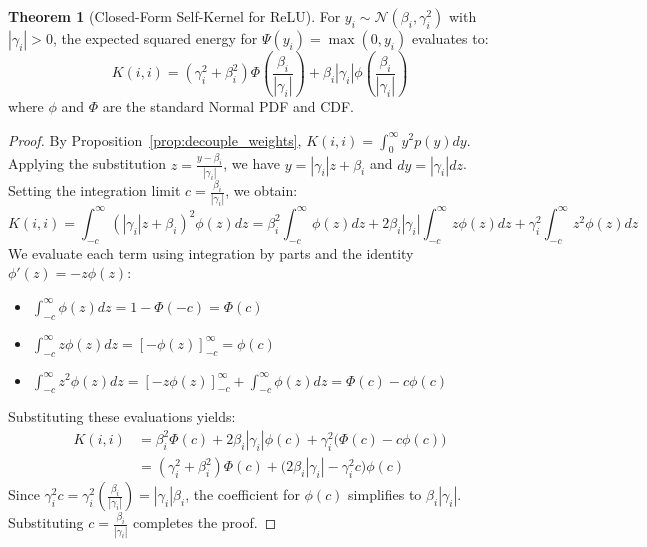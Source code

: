 \documentclass[11pt, a4paper, copyright, gdm]{google}
\newcommand{\calN}{\mathcal{N}}
\newcommand{\normPDF}{\phi}
\newcommand{\normCDF}{\Phi}
\theoremstyle{definition}
\newtheorem{theorem}{Theorem}[section]
\begin{document}
\begin{theorem}[Closed-Form Self-Kernel for ReLU]
\label{theorem:self_kernel}
For $y_i \sim \calN(\beta_i, \gamma_i^2)$ with $|\gamma_i| > 0$, the expected squared energy for $\Psi(y_i) = \max(0, y_i)$ evaluates to:
\begin{equation}
    K(i, i) = (\gamma_i^2 + \beta_i^2)\normCDF\left(\frac{\beta_i}{|\gamma_i|}\right) + \beta_i|\gamma_i|\normPDF\left(\frac{\beta_i}{|\gamma_i|}\right)
\end{equation}
where $\normPDF$ and $\normCDF$ are the standard Normal PDF and CDF.
\end{theorem}
\begin{proof}
By Proposition~\ref{prop:decouple_weights}, $K(i, i) = \int_{0}^{\infty} y^2 p(y) dy$. Applying the substitution $z = \frac{y-\beta_i}{|\gamma_i|}$, we have $y = |\gamma_i| z + \beta_i$ and $dy = |\gamma_i| dz$. Setting the integration limit $c = \frac{\beta_i}{|\gamma_i|}$, we obtain:
\begin{equation*}
    K(i, i) = \int_{-c}^{\infty} (|\gamma_i| z + \beta_i)^2 \normPDF(z) dz = \beta_i^2 \int_{-c}^{\infty} \normPDF(z) dz + 2\beta_i|\gamma_i| \int_{-c}^{\infty} z\normPDF(z) dz + \gamma_i^2 \int_{-c}^{\infty} z^2\normPDF(z) dz
\end{equation*}
We evaluate each term using integration by parts and the identity $\normPDF'(z) = -z\normPDF(z)$:
\begin{itemize}
    \item $\int_{-c}^{\infty} \normPDF(z) dz = 1 - \normCDF(-c) = \normCDF(c)$
    \item $\int_{-c}^{\infty} z\normPDF(z) dz = [-\normPDF(z)]_{-c}^{\infty} = \normPDF(c)$
    \item $\int_{-c}^{\infty} z^2\normPDF(z) dz = [-z\normPDF(z)]_{-c}^{\infty} + \int_{-c}^{\infty} \normPDF(z) dz = \normCDF(c) - c\normPDF(c)$
\end{itemize}
Substituting these evaluations yields:
\begin{align*}
    K(i, i) &= \beta_i^2 \normCDF(c) + 2\beta_i|\gamma_i|\normPDF(c) + \gamma_i^2 \big( \normCDF(c) - c\normPDF(c) \big) \\
    &= (\gamma_i^2 + \beta_i^2)\normCDF(c) + \big( 2\beta_i|\gamma_i| - \gamma_i^2 c \big) \normPDF(c)
\end{align*}
Since $\gamma_i^2 c = \gamma_i^2 (\frac{\beta_i}{|\gamma_i|}) = |\gamma_i|\beta_i$, the coefficient for $\normPDF(c)$ simplifies to $\beta_i|\gamma_i|$. Substituting $c = \frac{\beta_i}{|\gamma_i|}$ completes the proof.
\end{proof}
\end{document}
